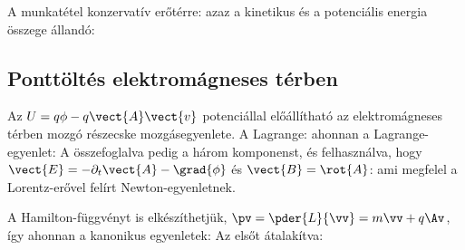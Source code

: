    A munkatétel konzervatív erőtérre:
   azaz a kinetikus és a potenciális energia összege állandó:
   
  \subsection{Ponttöltés elektromágneses térben}\label{ss:03-toltesEMterben}
   
   Az $U=q\phi-q\vect{A}\vect{v}$ potenciállal előállítható az elektromágneses térben mozgó részecske mozgásegyenlete.
   A Lagrange:
   ahonnan a Lagrange-egyenlet:
   A összefoglalva pedig a három komponenst, és felhasználva, hogy $\vect{E}=-\partial_t\vect{A}-\grad{\phi}$ és $\vect{B}=\rot{A}$:
   ami megfelel a Lorentz-erővel felírt Newton-egyenletnek. 
   
   A Hamilton-függvényt is elkészíthetjük, $\pv=\pder{L}{\vv}=m\vv+q\Av$, így
   ahonnan a kanonikus egyenletek:
   Az elsőt átalakítva:


